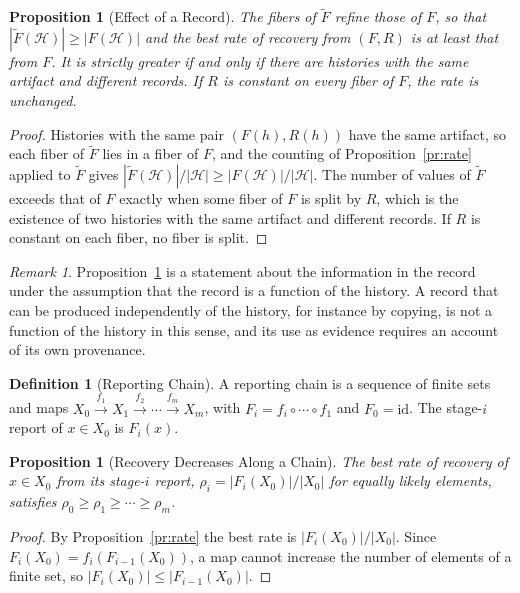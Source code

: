 \documentclass[11pt,letterpaper]{report}
\theoremstyle{plain}
\newtheorem{proposition}[theorem]{Proposition}
\theoremstyle{definition}
\newtheorem{definition}[theorem]{Definition}
\theoremstyle{remark}
\newtheorem{remark}[theorem]{Remark}
\begin{document}
\begin{proposition}[Effect of a Record]\label{pr:record}
The fibers of $\widetilde F$ refine those of $F$, so that $|\widetilde F(\mathcal H)|\ge|F(\mathcal H)|$ and the best rate of recovery from $(F,R)$ is at least that from $F$. It is strictly greater if and only if there are histories with the same artifact and different records. If $R$ is constant on every fiber of $F$, the rate is unchanged.
\end{proposition}
\begin{proof}
Histories with the same pair $(F(h),R(h))$ have the same artifact, so each fiber of $\widetilde F$ lies in a fiber of $F$, and the counting of Proposition~\ref{pr:rate} applied to $\widetilde F$ gives $|\widetilde F(\mathcal H)|/|\mathcal H|\ge|F(\mathcal H)|/|\mathcal H|$. The number of values of $\widetilde F$ exceeds that of $F$ exactly when some fiber of $F$ is split by $R$, which is the existence of two histories with the same artifact and different records. If $R$ is constant on each fiber, no fiber is split.
\end{proof}

\begin{remark}
Proposition~\ref{pr:record} is a statement about the information in the record under the assumption that the record is a function of the history. A record that can be produced independently of the history, for instance by copying, is not a function of the history in this sense, and its use as evidence requires an account of its own provenance.
\end{remark}

\begin{definition}[Reporting Chain]\label{def:reportchain}
A reporting chain is a sequence of finite sets and maps $X_0\xrightarrow{f_1}X_1\xrightarrow{f_2}\cdots\xrightarrow{f_m}X_m$, with $F_i=f_i\circ\cdots\circ f_1$ and $F_0=\mathrm{id}$. The stage-$i$ report of $x\in X_0$ is $F_i(x)$.
\end{definition}

\begin{proposition}[Recovery Decreases Along a Chain]\label{pr:chainrate}
The best rate of recovery of $x\in X_0$ from its stage-$i$ report, $\rho_i=|F_i(X_0)|/|X_0|$ for equally likely elements, satisfies $\rho_0\ge\rho_1\ge\cdots\ge\rho_m$.
\end{proposition}
\begin{proof}
By Proposition~\ref{pr:rate} the best rate is $|F_i(X_0)|/|X_0|$. Since $F_i(X_0)=f_i(F_{i-1}(X_0))$, a map cannot increase the number of elements of a finite set, so $|F_i(X_0)|\le|F_{i-1}(X_0)|$.
\end{proof}
\end{document}
